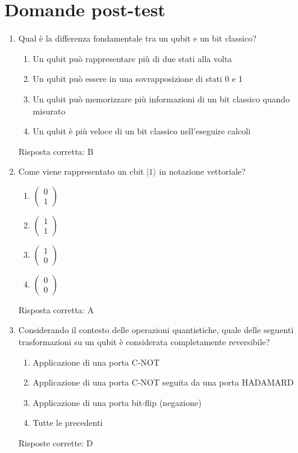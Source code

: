 \documentclass{article}
\begin{document}
\section*{Domande post-test}

\begin{enumerate}[label=\textbf{Domanda \arabic*.}]

\item Qual è la differenza fondamentale tra un qubit e un bit classico?
\begin{enumerate}[label=\Alph*.]
\item Un qubit può rappresentare più di due stati alla volta
\item Un qubit può essere in una sovrapposizione di stati 0 e 1
\item Un qubit può memorizzare più informazioni di un bit classico quando misurato
\item Un qubit è più veloce di un bit classico nell'eseguire calcoli
\end{enumerate}
Risposta corretta: B

\item Come viene rappresentato un cbit \(|1\rangle\) in notazione vettoriale?
\begin{enumerate}[label=\Alph*.]
    \item \( \begin{pmatrix} 0 \\ 1 \end{pmatrix} \)
    \item \( \begin{pmatrix} 1 \\ 1 \end{pmatrix} \)
    \item \( \begin{pmatrix} 1 \\ 0 \end{pmatrix} \)
    \item \( \begin{pmatrix} 0 \\ 0 \end{pmatrix} \)
\end{enumerate}
Risposta corretta: A

\item Considerando il contesto delle operazioni quantistiche, quale delle seguenti trasformazioni su un qubit è considerata completamente reversibile?
    \begin{enumerate}[label=\Alph*.]
        \item Applicazione di una porta C-NOT
        \item Applicazione di una porta C-NOT seguita da una porta HADAMARD
        \item Applicazione di una porta bit-flip (negazione)
        \item Tutte le precedenti
    \end{enumerate}
    Risposte corrette: D


\end{enumerate}
\end{document}
